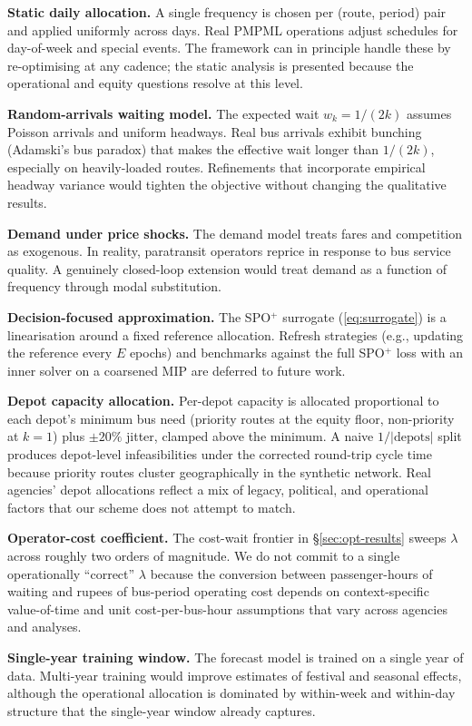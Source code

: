 \documentclass[a4paper,twoside]{article}
\begin{document}
\textbf{Static daily allocation.} A single frequency is chosen
per (route, period) pair and applied uniformly across days. Real
PMPML operations adjust schedules for day-of-week and special
events. The framework can in principle handle these by
re-optimising at any cadence; the static analysis is presented
because the operational and equity questions resolve at this
level.

\textbf{Random-arrivals waiting model.} The expected wait
$w_k = 1/(2k)$ assumes Poisson arrivals and uniform headways.
Real bus arrivals exhibit bunching (Adamski's bus paradox) that
makes the effective wait longer than $1/(2k)$, especially on
heavily-loaded routes. Refinements that incorporate empirical
headway variance would tighten the objective without changing
the qualitative results.

\textbf{Demand under price shocks.} The demand model treats
fares and competition as exogenous. In reality, paratransit
operators reprice in response to bus service quality. A
genuinely closed-loop extension would treat demand as a function
of frequency through modal substitution.

\textbf{Decision-focused approximation.} The SPO$^+$ surrogate
(\ref{eq:surrogate}) is a linearisation around a fixed reference
allocation. Refresh strategies (e.g., updating the reference
every $E$ epochs) and benchmarks against the full SPO$^+$ loss
with an inner solver on a coarsened MIP are deferred to future
work.

\textbf{Depot capacity allocation.} Per-depot capacity is
allocated proportional to each depot's minimum bus need (priority
routes at the equity floor, non-priority at $k = 1$) plus
$\pm 20\%$ jitter, clamped above the minimum. A naive
$1/|\mathrm{depots}|$ split produces depot-level infeasibilities
under the corrected round-trip cycle time because priority
routes cluster geographically in the synthetic network. Real
agencies' depot allocations reflect a mix of legacy, political,
and operational factors that our scheme does not attempt to
match.

\textbf{Operator-cost coefficient.} The cost-wait frontier in
\S\ref{sec:opt-results} sweeps $\lambda$ across roughly two orders
of magnitude. We do not commit to a single operationally
``correct'' $\lambda$ because the conversion between
passenger-hours of waiting and rupees of bus-period operating
cost depends on context-specific value-of-time and unit
cost-per-bus-hour assumptions that vary across agencies and
analyses.

\textbf{Single-year training window.} The forecast model is
trained on a single year of data. Multi-year training would
improve estimates of festival and seasonal effects, although the
operational allocation is dominated by within-week and
within-day structure that the single-year window already
captures.
\end{document}
